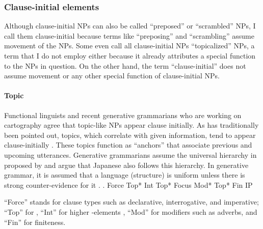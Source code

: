 
\subsubsection{Clause-initial elements}

Although clause-initial NPs can also be called
``preposed'' or ``scrambled'' NPs,
I call them clause-initial
because terms like ``preposing'' and ``scrambling'' assume
movement of the NPs.
Some even call all clause-initial NPs ``topicalized'' NPs, a term that I do not employ either because
it already attributes a special function to the NPs in question.
On the other hand, the term ``clause-initial'' does not assume movement or any other special function of clause-initial NPs.

\paragraph{Topic}

Functional linguists and recent generative grammarians who are working on cartography agree that topic-like NPs appear clause initially.
As has traditionally been pointed out,
topics, which correlate with given information,
tend to appear clause-initially
\cite{mathesius28,firbas64,danes70,kuno78}.
These topics function as ``anchors''
that associate previous and upcoming utterances.
Generative grammarians \cite[e.g.,][]{endo14} assume the universal hierarchy in \Next proposed by 
and argue that Japanese also follows this hierarchy.
In generative grammar,
it is assumed that a language (structure) is uniform
unless there is strong counter-evidence for it
\cite[the Uniformity Principle:][2]{chomsky01}.
%
 \ex. Force Top* Int Top* Focus Mod* Top* Fin IP
    \hfill{\cite[242]{rizzi04}}

``Force'' stands for clause types such as declarative, interrogative, and imperative;
``Top'' for ,
``Int'' for higher -elements \cite{rizzi01},
``Mod'' for modifiers such as adverbs, and
``Fin'' for finiteness.


